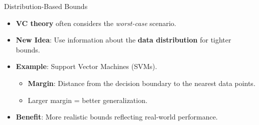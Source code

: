 \documentclass[
  ignorenonframetext,
]{beamer}
\providecommand{\tightlist}{%
  \setlength{\itemsep}{0pt}\setlength{\parskip}{0pt}}\usepackage{longtable,booktabs,array}
\begin{document}
\begin{frame}{Distribution-Based Bounds}
\label{distribution-based-bounds}
\begin{itemize}
\tightlist
\item
  \textbf{VC theory} often considers the \emph{worst-case} scenario.
\item
  \textbf{New Idea}: Use information about the \textbf{data
  distribution} for tighter bounds.
\item
  \textbf{Example}: Support Vector Machines (SVMs).

  \begin{itemize}
  \tightlist
  \item
    \textbf{Margin}: Distance from the decision boundary to the nearest
    data points.
  \item
    Larger margin = better generalization.
  \end{itemize}
\item
  \textbf{Benefit}: More realistic bounds reflecting real-world
  performance.
\end{itemize}
\end{frame}
\end{document}
